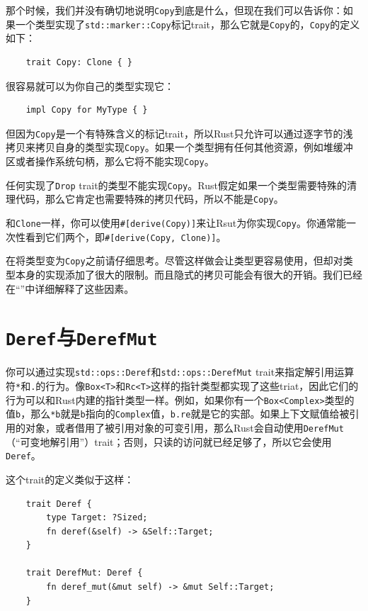 那个时候，我们并没有确切地说明\texttt{Copy}到底是什么，但现在我们可以告诉你：如果一个类型实现了\texttt{std::marker::Copy}标记trait，那么它就是\texttt{Copy}的，\texttt{Copy}的定义如下：
\begin{verbatim}
    trait Copy: Clone { }
\end{verbatim}

很容易就可以为你自己的类型实现它：
\begin{verbatim}
    impl Copy for MyType { }
\end{verbatim}

但因为\texttt{Copy}是一个有特殊含义的标记trait，所以Rust只允许可以通过逐字节的浅拷贝来拷贝自身的类型实现\texttt{Copy}。如果一个类型拥有任何其他资源，例如堆缓冲区或者操作系统句柄，那么它将不能实现\texttt{Copy}。

任何实现了\texttt{Drop} trait的类型不能实现\texttt{Copy}。Rust假定如果一个类型需要特殊的清理代码，那么它肯定也需要特殊的拷贝代码，所以不能是\texttt{Copy}。

和\texttt{Clone}一样，你可以使用\texttt{\#[derive(Copy)]}来让Rsut为你实现\texttt{Copy}。你通常能一次性看到它们两个，即\texttt{\#[derive(Copy, Clone)]}。

在将类型变为\texttt{Copy}之前请仔细思考。尽管这样做会让类型更容易使用，但却对类型本身的实现添加了很大的限制。而且隐式的拷贝可能会有很大的开销。我们已经在“”中详细解释了这些因素。

\section{\texttt{Deref}与\texttt{DerefMut}}\label{deref}

你可以通过实现\texttt{std::ops::Deref}和\texttt{std::ops::DerefMut} trait来指定解引用运算符\texttt{*}和\texttt{.}的行为。像\texttt{Box<T>}和\texttt{Rc<T>}这样的指针类型都实现了这些triat，因此它们的行为可以和Rust内建的指针类型一样。例如，如果你有一个\texttt{Box<Complex>}类型的值\texttt{b}，那么\texttt{*b}就是\texttt{b}指向的\texttt{Complex}值，\texttt{b.re}就是它的实部。如果上下文赋值给被引用的对象，或者借用了被引用对象的可变引用，那么Rust会自动使用\texttt{DerefMut}（“可变地解引用”）trait；否则，只读的访问就已经足够了，所以它会使用\texttt{Deref}。

这个trait的定义类似于这样：
\begin{verbatim}
    trait Deref {
        type Target: ?Sized;
        fn deref(&self) -> &Self::Target;
    }

    trait DerefMut: Deref {
        fn deref_mut(&mut self) -> &mut Self::Target;
    }
\end{verbatim}

